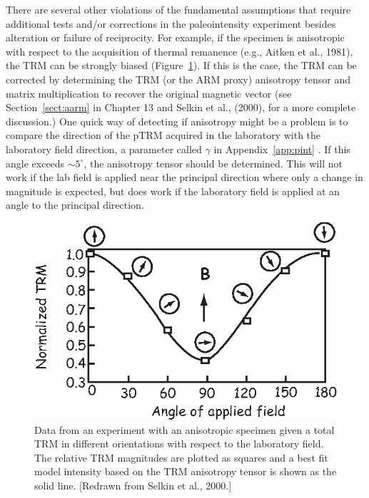 There are several other violations of the fundamental assumptions that require additional tests 
 and/or corrections in the paleointensity experiment besides alteration or failure of  reciprocity.   For example, if the specimen is anisotropic with respect to the acquisition of thermal remanence (e.g., 
Aitken et al., 1981), \nocite{aitken81} the  TRM can be strongly biased (Figure~\ref{fig:trm-anis}).  If this is the case, the TRM can be corrected by determining the TRM  (or the ARM proxy) anisotropy tensor and matrix multiplication to recover the original magnetic vector (see Section~\ref{sect:aarm} in Chapter 13 and 
 Selkin et al., (2000), for a more complete discussion.) \nocite{selkin00b}   One quick way of detecting if anisotropy might be a problem is to compare the direction of the pTRM acquired in the laboratory with the laboratory field direction, a parameter called $\gamma$ in Appendix~\ref{app:pint} .  If this angle exceeds  $\sim 5 ^{\circ}$,  the anisotropy tensor should be determined.   This will not  work if the lab field is applied near the principal direction where only a change in magnitude is expected, but does work if the laboratory field is applied at an angle to the principal direction. 
 
\begin{figure}[h!tb]
\centering  \includegraphics[width= 9 cm]{EPSfiles/trm-anis.eps}
\caption{Data from an experiment with an anisotropic specimen given a total TRM in different orientations with respect to the laboratory field.  The relative TRM magnitudes are plotted as squares and a best fit model intensity based on the TRM anisotropy tensor is shown as the solid line.  [Redrawn from Selkin et al., 2000.]}
\label{fig:trm-anis}
\end{figure}


